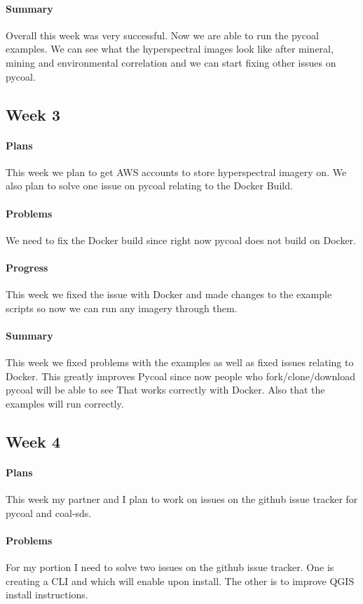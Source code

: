 \documentclass{article}
\begin{document}
\paragraph{Summary}
Overall this week was very successful. Now we are able to run the pycoal examples. We can see what the hyperspectral images look like after mineral, mining and environmental correlation and we can start fixing other issues on pycoal. 
\subsection{Week 3}
\paragraph{Plans}
This week we plan to get AWS accounts to store hyperspectral imagery on. We also plan to solve one issue on pycoal relating to the Docker Build. 
\paragraph{Problems}
We need to fix the Docker build since right now pycoal does not build on Docker. 
\paragraph{Progress}
This week we fixed the issue with Docker and made changes to the example scripts so now we can run any imagery through them. 
\paragraph{Summary}
This week we fixed problems with the examples as well as fixed issues relating to Docker.
This greatly improves Pycoal since now people who fork/clone/download pycoal will be able to see
That works correctly with Docker. Also that the examples will run correctly. 
\subsection{Week 4}
\paragraph{Plans}
This week my partner and I plan to work on issues on the github issue tracker for pycoal and coal-sds. 
\paragraph{Problems}
For my portion I need to solve two issues on the github issue tracker. One is creating a CLI and which will enable upon install. The other is to improve QGIS install instructions.
\end{document}
